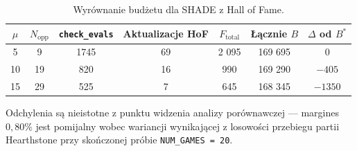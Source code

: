 \begin{table}[h]
\centering
\caption{Wyrównanie budżetu dla SHADE z Hall of Fame.}
\label{tab:budget_hof}
\begin{tabular}{ccccccc}
\toprule
$\mu$ & $N_{\text{opp}}$ & \texttt{check\_evals} &
Aktualizacje HoF & $F_{\text{total}}$ & Łącznie $B$ &
$\Delta$ od $B^*$ \\
\midrule
5  & 9  & 1745 & 69 & 2 095 & 169 695 & $0$        \\
10 & 19 & 820  & 16 & 990     & 169 290 & $-405$     \\
15 & 29 & 525  & 7  & 645     & 168 345 & $-1 350$ \\
\bottomrule
\end{tabular}
\end{table}

Odchylenia są nieistotne z punktu widzenia analizy porównawczej --- margines $0{,}80\%$ jest pomijalny wobec wariancji wynikającej z losowości przebiegu partii Hearthstone przy skończonej próbie \texttt{NUM\_GAMES = 20}.

